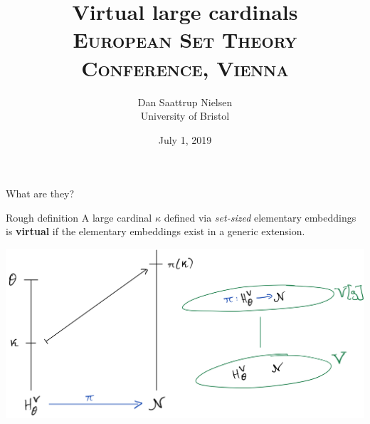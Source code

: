 \documentclass{beamer}
\title[Virtual large cardinals]{Virtual large cardinals\\ {\small\textsc{European Set Theory Conference, Vienna}}}
\author[Dan Saattrup Nielsen]{Dan Saattrup Nielsen\\ University of Bristol}
\date{July 1, 2019}
\begin{document}
{

\begin{frame}
	\titlepage
\end{frame}
}

\begin{frame}{What are they?}
  \begin{block}{Rough definition}
    A large cardinal $\kappa$ defined via \textit{set-sized} elementary embeddings is \textbf{virtual} if the elementary embeddings exist in a generic extension.
  \end{block}

  \begin{center}
    \includegraphics[scale=0.15]{gfx/virtual.jpg}
  \end{center}
\end{frame}
\end{document}
